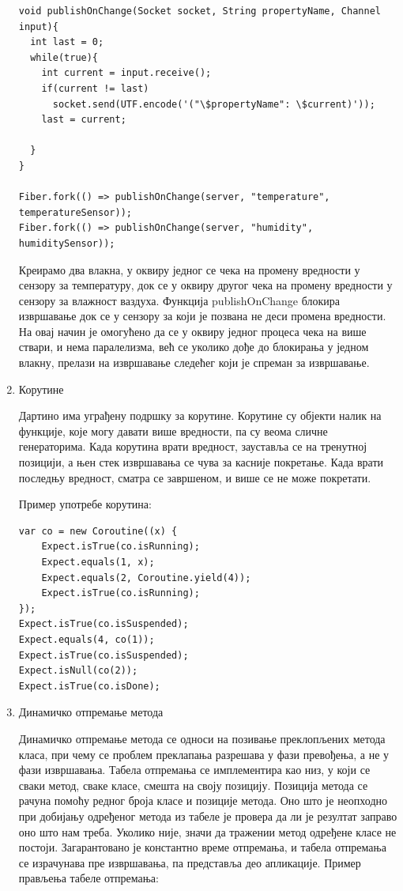 \documentclass[12pt,oneside]{memoir}
\begin{document}
\begin{enumerate}
\begin{verbatim}
void publishOnChange(Socket socket, String propertyName, Channel input){
  int last = 0;
  while(true){
    int current = input.receive();
    if(current != last)
      socket.send(UTF.encode('("\$propertyName": \$current)'));
    last = current;
  
  }
}

Fiber.fork(() => publishOnChange(server, "temperature", temperatureSensor));
Fiber.fork(() => publishOnChange(server, "humidity", humiditySensor));

\end{verbatim}
Креирамо два влакна, у оквиру једног се чека на промену вредности у сензору за температуру, док се у оквиру другог чека на промену вредности у сензору за влажност ваздуха. Функција publishOnChange блокира извршавање док се у сензору за који је позвана не деси промена вредности. На овај начин је омогућено да се у оквиру једног процеса чека на више ствари, и нема паралелизма, већ се уколико дође до блокирања у једном влакну, прелази на извршавање следећег који је спреман за извршавање.

\item Корутине

Дартино има уграђену подршку за корутине. Корутине су објекти налик на функције, које могу давати више вредности, па су веома сличне генераторима. Када корутина врати вредност, зауставља се на тренутној позицији, а њен стек извршавања се чува за касније покретање. Када врати последњу вредност, сматра се завршеном, и више се не може покретати.

Пример употребе корутина:

\begin{verbatim}
var co = new Coroutine((x) {
    Expect.isTrue(co.isRunning);
    Expect.equals(1, x);
    Expect.equals(2, Coroutine.yield(4));
    Expect.isTrue(co.isRunning);
});
Expect.isTrue(co.isSuspended);
Expect.equals(4, co(1));
Expect.isTrue(co.isSuspended);
Expect.isNull(co(2));
Expect.isTrue(co.isDone);
\end{verbatim}

\item Динамичко отпремање метода

Динамичко отпремање метода се односи на позивање преклопљених метода класа, при чему се проблем преклапања разрешава у фази превођења, а не у фази извршавања. Табела отпремања се имплементира као низ, у који се сваки метод, сваке класе, смешта на своју позицију. Позиција метода се рачуна помоћу редног броја класе и  позиције метода. Оно што је неопходно при добијању одређеног метода из табеле је провера да ли је резултат заправо оно што нам треба. Уколико није, значи да тражении метод одређене класе не постоји. Загарантовано је константно време отпремања, и табела отпремања се израчунава пре извршавања, па представља део апликације.
Пример прављења табеле отпремања:


\end{enumerate}
\end{document}
